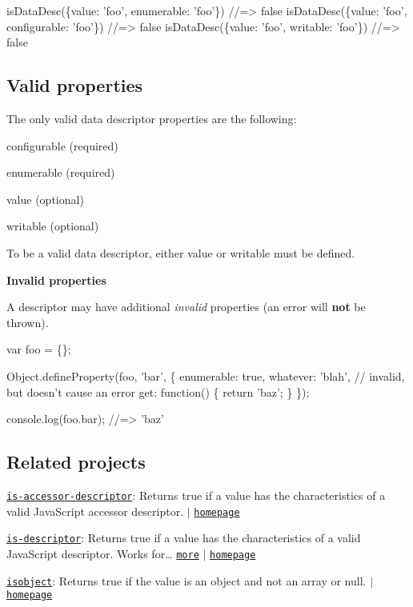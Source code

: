 \begin{DoxyCode}
isDataDesc(\{value: 'foo', enumerable: 'foo'\})
//=> false
isDataDesc(\{value: 'foo', configurable: 'foo'\})
//=> false
isDataDesc(\{value: 'foo', writable: 'foo'\})
//=> false
\end{DoxyCode}


\subsection*{Valid properties}

The only valid data descriptor properties are the following\+:


\begin{DoxyItemize}
\item {\ttfamily configurable} (required)
\item {\ttfamily enumerable} (required)
\item {\ttfamily value} (optional)
\item {\ttfamily writable} (optional)
\end{DoxyItemize}

To be a valid data descriptor, either {\ttfamily value} or {\ttfamily writable} must be defined.

{\bfseries Invalid properties}

A descriptor may have additional {\itshape invalid} properties (an error will {\bfseries not} be thrown).


\begin{DoxyCode}
var foo = \{\};

Object.defineProperty(foo, 'bar', \{
  enumerable: true,
  whatever: 'blah', // invalid, but doesn't cause an error
  get: function() \{
    return 'baz';
  \}
\});

console.log(foo.bar);
//=> 'baz'
\end{DoxyCode}


\subsection*{Related projects}


\begin{DoxyItemize}
\item \href{https://www.npmjs.com/package/is-accessor-descriptor}{\tt is-\/accessor-\/descriptor}\+: Returns true if a value has the characteristics of a valid Java\+Script accessor descriptor. $\vert$ \href{https://github.com/jonschlinkert/is-accessor-descriptor}{\tt homepage}
\item \href{https://www.npmjs.com/package/is-descriptor}{\tt is-\/descriptor}\+: Returns true if a value has the characteristics of a valid Java\+Script descriptor. Works for… \href{https://www.npmjs.com/package/is-descriptor}{\tt more} $\vert$ \href{https://github.com/jonschlinkert/is-descriptor}{\tt homepage}
\item \href{https://www.npmjs.com/package/isobject}{\tt isobject}\+: Returns true if the value is an object and not an array or null. $\vert$ \href{https://github.com/jonschlinkert/isobject}{\tt homepage}
\end{DoxyItemize}

